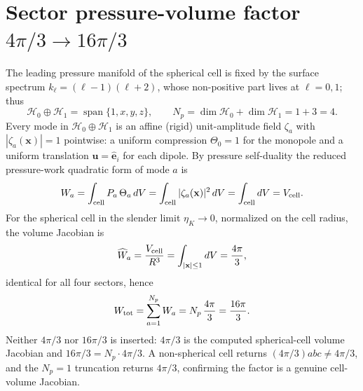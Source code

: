 \section{Sector pressure-volume factor \(4\pi/3\to16\pi/3\)}
The leading pressure manifold of the spherical cell is fixed by the surface
spectrum \(k_\ell=(\ell-1)(\ell+2)\), whose non-positive part lives at
\(\ell=0,1\); thus
\[
  \mathcal H_0\oplus\mathcal H_1=\operatorname{span}\{1,x,y,z\},
  \qquad N_p=\dim\mathcal H_0+\dim\mathcal H_1=1+3=4 .
\]
Every mode in \(\mathcal H_0\oplus\mathcal H_1\) is an affine (rigid)
unit-amplitude field \(\zeta_a\) with \(|\zeta_a(\mathbf x)|=1\) pointwise: a
uniform compression \(\Theta_0=1\) for the monopole and a uniform translation
\(\mathbf u=\hat{\mathbf e}_i\) for each dipole. By pressure self-duality the
reduced pressure-work quadratic form of mode \(a\) is
\[
  W_a=\int_{\rm cell}P_a\,\Theta_a\,dV
     =\int_{\rm cell}|\zeta_a(\mathbf x)|^2\,dV
     =\int_{\rm cell}dV=V_{\rm cell}.
\]
For the spherical cell in the slender limit \(\eta_K\to0\), normalized on the
cell radius, the volume Jacobian is
\[
  \widehat W_a=\frac{V_{\rm cell}}{R^3}=\int_{|\mathbf x|\le1}dV=\frac{4\pi}{3},
\]
identical for all four sectors, hence
\[
  W_{\rm tot}=\sum_{a=1}^{N_p}W_a=N_p\,\frac{4\pi}{3}=\frac{16\pi}{3}.
\]
Neither \(4\pi/3\) nor \(16\pi/3\) is inserted: \(4\pi/3\) is the computed
spherical-cell volume Jacobian and \(16\pi/3=N_p\cdot4\pi/3\). A non-spherical
cell returns \((4\pi/3)abc\neq4\pi/3\), and the \(N_p=1\) truncation returns
\(4\pi/3\), confirming the factor is a genuine cell-volume Jacobian.
